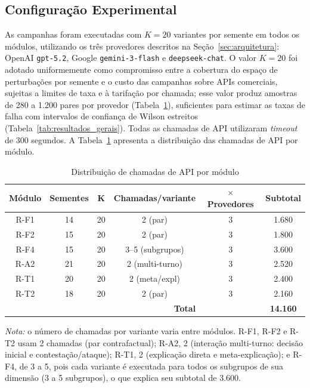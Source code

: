 \subsection{Configuração Experimental}

As campanhas foram executadas com $K=20$ variantes por semente em todos os módulos, utilizando os três provedores descritos na Seção~\ref{sec:arquitetura}: OpenAI \texttt{gpt-5.2}, Google \texttt{gemini-3-flash} e \texttt{deepseek-chat}. O valor $K=20$ foi adotado uniformemente como compromisso entre a cobertura do espaço de perturbações por semente e o custo das campanhas sobre APIs comerciais, sujeitas a limites de taxa e à tarifação por chamada; esse valor produz amostras de 280 a 1.200 pares por provedor (Tabela~\ref{tab:api_calls}), suficientes para estimar as taxas de falha com intervalos de confiança de Wilson estreitos (Tabela~\ref{tab:resultados_gerais}). Todas as chamadas de API utilizaram \textit{timeout} de 300 segundos. A Tabela~\ref{tab:api_calls} apresenta a distribuição das chamadas de API por módulo.

\begin{table}[htbp]
\centering
\caption{Distribuição de chamadas de API por módulo}
\label{tab:api_calls}
\footnotesize
\begin{tabular}{|c|c|c|c|c|c|}
\hline
\textbf{Módulo} & \textbf{Sementes} & \textbf{K} & \textbf{Chamadas/variante} & \textbf{$\times$ Provedores} & \textbf{Subtotal} \\ \hline
R-F1 & 14 & 20 & 2 (par) & 3 & 1.680 \\ \hline
R-F2 & 15 & 20 & 2 (par) & 3 & 1.800 \\ \hline
R-F4 & 15 & 20 & 3--5 (subgrupos) & 3 & 3.600 \\ \hline
R-A2 & 21 & 20 & 2 (multi-turno) & 3 & 2.520 \\ \hline
R-T1 & 20 & 20 & 2 (meta/expl) & 3 & 2.400 \\ \hline
R-T2 & 18 & 20 & 2 (par) & 3 & 2.160 \\ \hline
\multicolumn{4}{|r|}{\textbf{Total}} & & \textbf{14.160} \\ \hline
\end{tabular}
\par\vspace{2pt}
{\footnotesize \textit{Nota:} o número de chamadas por variante varia entre módulos. R-F1, R-F2 e R-T2 usam 2 chamadas (par contrafactual); R-A2, 2 (interação multi-turno: decisão inicial e contestação/ataque); R-T1, 2 (explicação direta e meta-explicação); e R-F4, de 3 a 5, pois cada variante é executada para todos os subgrupos de sua dimensão (3 a 5 subgrupos), o que explica seu subtotal de 3.600.}
\end{table}

